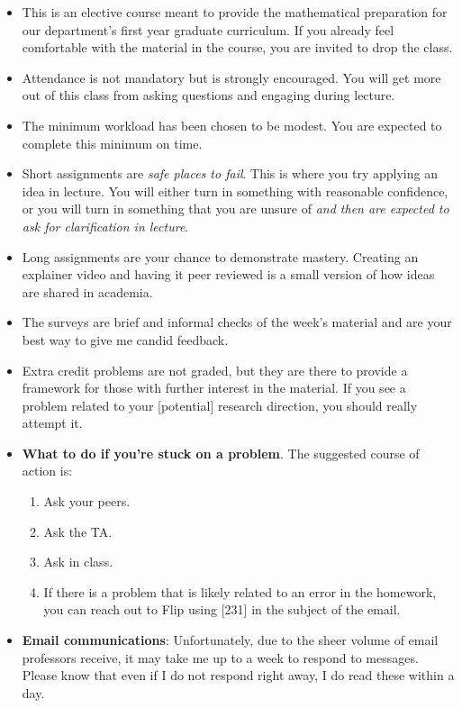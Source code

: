 \documentclass[12pt]{article}
\numberwithin{equation}{section}    %
\begin{document}
\begin{itemize}
	\item This is an elective course meant to provide the mathematical preparation for our department's first year graduate curriculum. If you already feel comfortable with the material in the course, you are invited to drop the class.
	\item Attendance is not mandatory but is strongly encouraged. You will get more out of this class from asking questions and engaging during lecture.
	\item The minimum workload has been chosen to be modest. You are expected to complete this minimum on time.
	\item Short assignments are \emph{safe places to fail}. This is where you try applying an idea in lecture. You will either turn in something with reasonable confidence, or you will turn in something that you are unsure of \emph{and then are expected to ask for clarification in lecture}. 
	\item Long assignments are your chance to demonstrate mastery. Creating an explainer video and having it peer reviewed is a small version of how ideas are shared in academia. 
	\item The surveys are brief and informal checks of the week's material and are your best way to give me candid feedback.
	\item Extra credit problems are not graded, but they are there to provide a framework for those with further interest in the material. If you see a problem related to your [potential] research direction, you should really attempt it.
	\item 	\textbf{What to do if you're stuck on a problem}. The suggested course of action is:
	\begin{enumerate}
		\item Ask your peers.
		\item Ask the TA.
		\item Ask in class.
		\item If there is a problem that is likely related to an error in the homework, you can reach out to Flip using \textsc{[231]} in the subject of the email.
	\end{enumerate}
	\item \textbf{Email communications}: Unfortunately, due to the sheer volume of email professors receive, it may take me up to a week to respond to messages. Please know that even if I do not respond right away, I do read these within a day.
\end{itemize}
\end{document}

